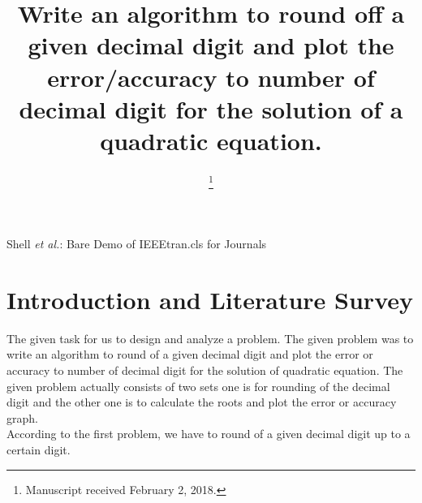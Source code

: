\documentclass[conference]{IEEEtran}
\begin{document}
\title{Write an algorithm to round off a given decimal digit and plot the error/accuracy to
number of decimal digit for the solution of a quadratic equation.}

\author{
\and
{}
\and
{}
\and
{}
\thanks{Manuscript received February 2, 2018.}}

{Shell \MakeLowercase{\textit{et al.}}: Bare Demo of IEEEtran.cls for Journals}

\maketitle

\IEEEpeerreviewmaketitle

\section{Introduction and Literature Survey}
The given task for us to design and analyze a problem. The given problem was to write an algorithm to round of a given decimal digit and plot the error or accuracy to number of decimal digit for the solution of quadratic equation. The given problem actually consists of two sets one is for rounding of the decimal digit and the other one is to calculate the roots and plot the error or accuracy graph.\\


According to the first problem, we have to round of a given decimal digit up to a certain digit.\\%
\end{document}
